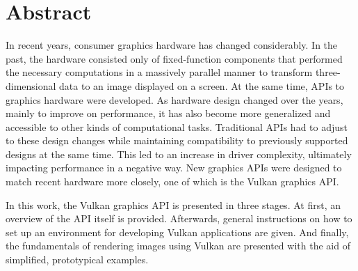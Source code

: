 \chapter*{Abstract}
\label{Abstract}
  In recent years, consumer graphics hardware has changed considerably.
  In the past, the hardware consisted only of fixed-function components that performed the necessary computations in a massively parallel manner to transform three-dimensional data to an image displayed on a screen.
  At the same time, APIs to graphics hardware were developed.
  As hardware design changed over the years, mainly to improve on performance, it has also become more generalized and accessible to other kinds of computational tasks.
  Traditional APIs had to adjust to these design changes while maintaining compatibility to previously supported designs at the same time.
  This led to an increase in driver complexity, ultimately impacting performance in a negative way.
  New graphics APIs were designed to match recent hardware more closely, one of which is the Vulkan graphics API.

  In this work, the Vulkan graphics API is presented in three stages.
  At first, an overview of the API itself is provided.
  Afterwards, general instructions on how to set up an environment for developing Vulkan applications are given.
  And finally, the fundamentals of rendering images using Vulkan are presented with the aid of simplified, prototypical examples.
